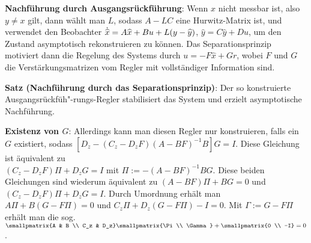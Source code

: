 \linie

\textbf{Nachführung durch Ausgangsrückführung}:
Wenn $x$ nicht messbar ist, also $y \not= x$ gilt, dann wählt man $L$, sodass $A - LC$ eine
Hurwitz-Matrix ist, und verwendet den Beobachter
$\dotwidehat{x} = A\widehat{x} + Bu + L(y - \widehat{y})$, $\widehat{y} = C\widehat{y} + Du$,
um den Zustand asymptotisch rekonstruieren zu können.
Das Separationsprinzip motiviert dann die Regelung des Systems durch
$u = -F\widehat{x} + Gr$, wobei $F$ und $G$ die Verstärkungsmatrizen vom Regler mit
vollständiger Information sind.

\textbf{Satz (Nachführung durch das Separationsprinzip)}:
Der so konstruierte Ausgangsrückfüh"-rungs-Regler stabilisiert das System und
erzielt asymptotische Nachführung.


\linie

\textbf{Existenz von $G$}:
Allerdings kann man diesen Regler nur konstruieren, falls ein $G$ existiert, sodass
$[D_z - (C_z - D_z F)(A - BF)^{-1} B] G = I$.
Diese Gleichung ist äquivalent zu\\
$(C_z - D_z F) \Pi + D_z G = I$ mit $\Pi := -(A - BF)^{-1} BG$.
Diese beiden Gleichungen sind wiederum äquivalent zu
$(A - BF)\Pi + BG = 0$ und $(C_z - D_z F) \Pi + D_z G = I$.
Durch Umordnung erhält man
$A\Pi + B(G - F\Pi) = 0$ und $C_z \Pi + D_z (G - F\Pi) - I = 0$.
Mit $\Gamma := G - F\Pi$ erhält man die sog. 
$\smallpmatrix{A & B \\ C_z & D_z} \smallpmatrix{\Pi \\ \Gamma} + \smallpmatrix{0 \\ -I} = 0$.

